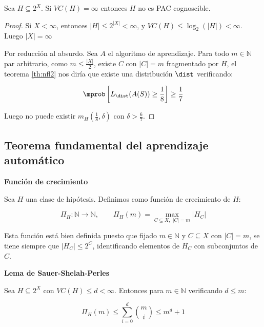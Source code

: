 \begin{corollary}
 Sea $H \subseteq 2^X$. Si $VC(H) = \infty$ entonces $H$ no es PAC cognoscible.
 \label{cor:vc-finito}
\end{corollary}

  \begin{proof}
  Si $X < \infty$, entonces $|H| \le 2^{|X|} < \infty$, y $VC(H) \le \log_2(|H|) < \infty$. Luego $|X| = \infty$
  
  Por reducción al absurdo. Sea $A$ el algoritmo de aprendizaje. Para todo $m\in \mathbb{N}$ par arbitrario, como 
  $m\le \frac{|X|}{2}$, existe $C$ con $|C| = m$ fragmentado por $H$, el teorema \ref{th:nfl2} nos diría que existe una 
  distribución $\dist$ verificando:
 
  \[\mprob \left[ L_{\dist}(A(S)) \ge \frac{1}{8} \right] \ge \frac{1}{7}\]
 
  Luego no puede existir $m_H \left(\frac{1}{8}, \delta\right)$ con $\delta > \frac{6}{7}$.
  \end{proof}
  
\subsection{Teorema fundamental del aprendizaje automático}

\begin{definition}
\textbf{Función de crecimiento}

Sea $H$ una clase de hipótesis. Definimos como función de crecimiento de $H$:

\[\Pi_{H}: \mathbb{N} \longrightarrow \mathbb{N}, \qquad \Pi_{H}(m) = \max_{C \subseteq X, \,\, |C|=m} |H_C|\]
\end{definition}

Esta función está bien definida puesto que fijado $m \in \mathbb{N}$ y $C\subseteq X$ con $|C| = m$, se tiene siempre 
que $|H_C| \le 2^C$, identificando elementos de $H_C$ con subconjuntos de $C$.

\begin{lemma} \textbf{Lema de Sauer-Shelah-Perles}

Sea $H \subseteq 2^X$ con $VC(H) \le d < \infty$. Entonces para $m\in \mathbb{N}$ verificando $d\le m$:

\[\Pi_{H} (m) \le \sum_{i=0}^d \binom{m}{i} \le m^d + 1\]
\label{lemma:sauer}
\end{lemma}


